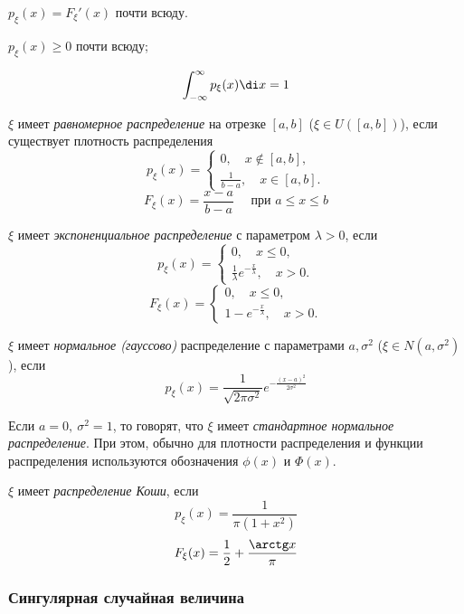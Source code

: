 \begin{remark}
	$ p_\xi(x) = F_\xi'(x) $ почти всюду.
\end{remark}

\begin{props}
\item $ p_\xi(x) \ge 0 $ почти всюду;
\item
	$$ \int_{-\infty}^\infty p_\xi(x) \di x = 1 $$
\end{props}

\begin{exmpls}
\item $ \xi $ имеет \emph{равномерное распределение} на отрезке $ [a, b] $ ($ \xi \in U([a, b]) $),
	если существует плотность распределения
	$$ p_\xi(x) =
	\begin{cases}
		0, \quad x \notin [a, b], \\
		\frac1{b - a}, \quad x \in [a, b].
	\end{cases} $$
	$$ F_\xi(x) = \frac{x - a}{b - a} \quad \text{ при } a \le x \le b $$
\item $ \xi $ имеет \emph{экспоненциальное распределение} с параметром $ \lambda > 0 $, если
	$$ p_\xi(x) =
	\begin{cases}
		0, \quad x \le 0, \\
		\frac1\lambda e^{-\frac x \lambda}, \quad x > 0.
	\end{cases} $$
	$$ F_\xi(x) =
	\begin{cases}
		0, \quad x \le 0, \\
		1 - e^{-\frac x \lambda}, \quad x > 0.
	\end{cases} $$
\item $ \xi $ имеет \emph{нормальное (гауссово)} распределение с параметрами $ a, \sigma^2 $ ($ \xi
	\in N(a, \sigma^2) $), если
	$$ p_\xi(x) = \frac1{\sqrt{2\pi \sigma^2}}e^{-\frac{(x - a)^2}{2\sigma^2}} $$

	Если $ a = 0, ~ \sigma^2 = 1 $, то говорят, что $ \xi $ имеет \emph{стандартное нормальное
	распределение}.
	При этом, обычно для плотности распределения и функции распределения используются обозначения
	$ \phi(x) $ и $ \Phi(x) $.
\item $ \xi $ имеет \emph{распределение Коши}, если
	$$ p_\xi(x) = \frac1{\pi(1 + x^2)} $$
	$$ F_\xi(x) = \frac12 + \frac{\arctg x}\pi $$
\end{exmpls}

\subsubsection{Сингулярная случайная величина}

